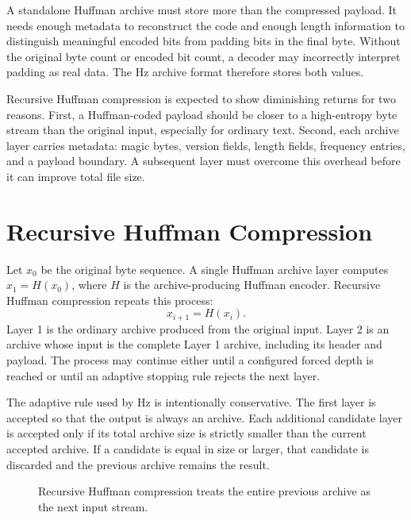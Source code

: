 \documentclass[conference]{IEEEtran}
\begin{document}
A standalone Huffman archive must store more than the compressed payload. It needs enough metadata to reconstruct the code and enough length information to distinguish meaningful encoded bits from padding bits in the final byte. Without the original byte count or encoded bit count, a decoder may incorrectly interpret padding as real data. The Hz archive format therefore stores both values.

Recursive Huffman compression is expected to show diminishing returns for two reasons. First, a Huffman-coded payload should be closer to a high-entropy byte stream than the original input, especially for ordinary text. Second, each archive layer carries metadata: magic bytes, version fields, length fields, frequency entries, and a payload boundary. A subsequent layer must overcome this overhead before it can improve total file size.

\section{Recursive Huffman Compression}

Let $x_0$ be the original byte sequence. A single Huffman archive layer computes $x_1 = H(x_0)$, where $H$ is the archive-producing Huffman encoder. Recursive Huffman compression repeats this process:
\[
    x_{i+1} = H(x_i).
\]
Layer 1 is the ordinary archive produced from the original input. Layer 2 is an archive whose input is the complete Layer 1 archive, including its header and payload. The process may continue either until a configured forced depth is reached or until an adaptive stopping rule rejects the next layer.

The adaptive rule used by Hz is intentionally conservative. The first layer is accepted so that the output is always an archive. Each additional candidate layer is accepted only if its total archive size is strictly smaller than the current accepted archive. If a candidate is equal in size or larger, that candidate is discarded and the previous archive remains the result.

\begin{figure}[t]
\centering
{}
\caption{Recursive Huffman compression treats the entire previous archive as the next input stream.}
\label{fig:nesting}
\end{figure}
\end{document}

